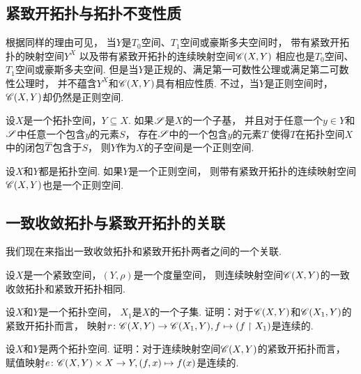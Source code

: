 \subsection{紧致开拓扑与拓扑不变性质}
根据同样的理由可见，
当\(Y\)是\(T_0\)空间、\(T_1\)空间或豪斯多夫空间时，
带有紧致开拓扑的映射空间\(Y^X\)
以及带有紧致开拓扑的连续映射空间\(\ContinuousFunctionSpace(X,Y)\)
相应也是\(T_0\)空间、\(T_1\)空间或豪斯多夫空间.
但是当\(Y\)是正规的、满足第一可数性公理或满足第二可数性公理时，
并不蕴含\(Y^X\)和\(\ContinuousFunctionSpace(X,Y)\)具有相应性质.
不过，当\(Y\)是正则空间时，
\(\ContinuousFunctionSpace(X,Y)\)却仍然是正则空间.

\begin{lemma}
设\(X\)是一个拓扑空间，\(Y \subseteq X\).
如果\(\S\)是\(X\)的一个子基，
并且对于任意一个\(y \in Y\)和\(\S\)中任意一个包含\(y\)的元素\(S\)，
存在\(\S\)中的一个包含\(y\)的元素\(T\)
使得\(T\)在拓扑空间\(X\)中的闭包\(\TopoClosureL{T}\)包含于\(S\)，
则\(Y\)作为\(X\)的子空间是一个正则空间.
\end{lemma}

\begin{theorem}
设\(X\)和\(Y\)都是拓扑空间.
如果\(Y\)是一个正则空间，
则带有紧致开拓扑的连续映射空间\(\ContinuousFunctionSpace(X,Y)\)也是一个正则空间.
\end{theorem}

\subsection{一致收敛拓扑与紧致开拓扑的关联}
我们现在来指出一致收敛拓扑和紧致开拓扑两者之间的一个关联.
\begin{theorem}
设\(X\)是一个紧致空间，\((Y,\rho)\)是一个度量空间，
则连续映射空间\(\ContinuousFunctionSpace(X,Y)\)的一致收敛拓扑和紧致开拓扑相同.
\end{theorem}

\begin{example}
设\(X\)和\(Y\)是一个拓扑空间，
\(X_1\)是\(X\)的一个子集.
证明：对于\(\ContinuousFunctionSpace(X,Y)\)和\(\ContinuousFunctionSpace(X_1,Y)\)的紧致开拓扑而言，
映射\(
	r\colon \ContinuousFunctionSpace(X,Y) \to \ContinuousFunctionSpace(X_1,Y),
	f \mapsto (f \SetRestrict X_1)
\)是连续的.
\end{example}

\begin{example}
设\(X\)和\(Y\)是两个拓扑空间.
证明：对于连续映射空间\(\ContinuousFunctionSpace(X,Y)\)的紧致开拓扑而言，
赋值映射\(
	e\colon \ContinuousFunctionSpace(X,Y) \times X \to Y,
	(f,x) \mapsto f(x)
\)是连续的.
\end{example}
